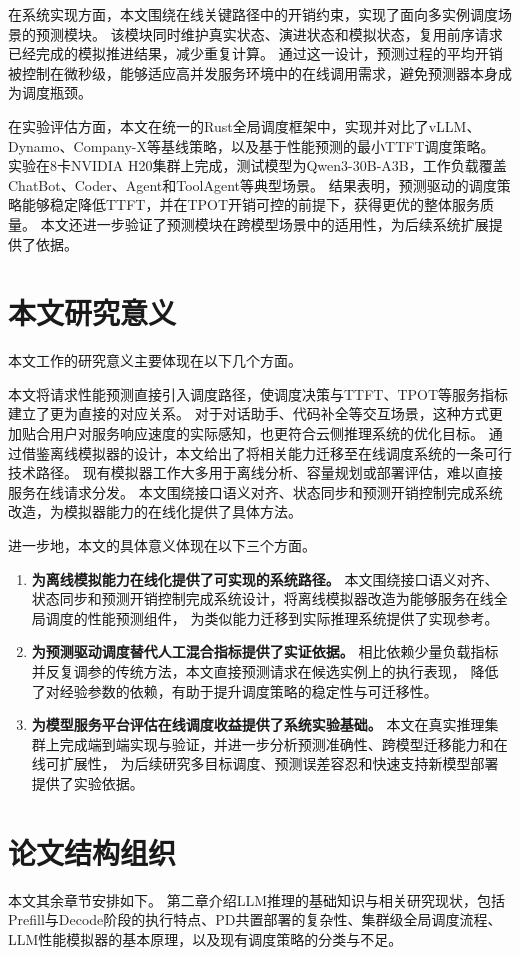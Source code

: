 在系统实现方面，本文围绕在线关键路径中的开销约束，实现了面向多实例调度场景的预测模块。
该模块同时维护真实状态、演进状态和模拟状态，复用前序请求已经完成的模拟推进结果，减少重复计算。
通过这一设计，预测过程的平均开销被控制在微秒级，能够适应高并发服务环境中的在线调用需求，避免预测器本身成为调度瓶颈。

在实验评估方面，本文在统一的Rust全局调度框架中，实现并对比了vLLM、Dynamo、Company-X等基线策略，以及基于性能预测的最小TTFT调度策略。
实验在8卡NVIDIA H20集群上完成，测试模型为Qwen3-30B-A3B，工作负载覆盖ChatBot、Coder、Agent和ToolAgent等典型场景。
结果表明，预测驱动的调度策略能够稳定降低TTFT，并在TPOT开销可控的前提下，获得更优的整体服务质量。
本文还进一步验证了预测模块在跨模型场景中的适用性，为后续系统扩展提供了依据。


\section{本文研究意义}
本文工作的研究意义主要体现在以下几个方面。

本文将请求性能预测直接引入调度路径，使调度决策与TTFT、TPOT等服务指标建立了更为直接的对应关系。
对于对话助手、代码补全等交互场景，这种方式更加贴合用户对服务响应速度的实际感知，也更符合云侧推理系统的优化目标。
通过借鉴离线模拟器的设计，本文给出了将相关能力迁移至在线调度系统的一条可行技术路径。
现有模拟器工作大多用于离线分析、容量规划或部署评估，难以直接服务在线请求分发。
本文围绕接口语义对齐、状态同步和预测开销控制完成系统改造，为模拟器能力的在线化提供了具体方法。

\noindent 进一步地，本文的具体意义体现在以下三个方面。
\begin{enumerate}
  \item \textbf{为离线模拟能力在线化提供了可实现的系统路径。}
    本文围绕接口语义对齐、状态同步和预测开销控制完成系统设计，将离线模拟器改造为能够服务在线全局调度的性能预测组件，
    为类似能力迁移到实际推理系统提供了实现参考。
  \item \textbf{为预测驱动调度替代人工混合指标提供了实证依据。}
    相比依赖少量负载指标并反复调参的传统方法，本文直接预测请求在候选实例上的执行表现，
    降低了对经验参数的依赖，有助于提升调度策略的稳定性与可迁移性。
  \item \textbf{为模型服务平台评估在线调度收益提供了系统实验基础。}
    本文在真实推理集群上完成端到端实现与验证，并进一步分析预测准确性、跨模型迁移能力和在线可扩展性，
    为后续研究多目标调度、预测误差容忍和快速支持新模型部署提供了实验依据。
\end{enumerate}

\section{论文结构组织}
本文其余章节安排如下。
第二章介绍LLM推理的基础知识与相关研究现状，包括Prefill与Decode阶段的执行特点、PD共置部署的复杂性、集群级全局调度流程、LLM性能模拟器的基本原理，以及现有调度策略的分类与不足。

